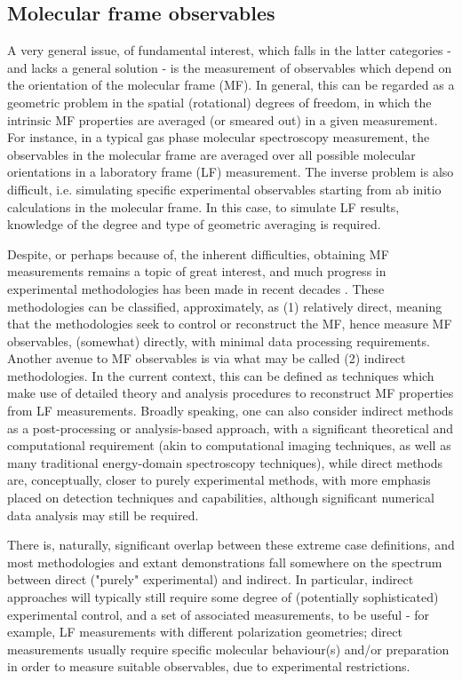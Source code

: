 \subsection{Molecular frame observables}

A very general issue, of fundamental interest, which falls in the latter categories - and lacks a general solution - is the measurement of observables which depend on the orientation of the molecular frame (MF). In general, this can be regarded as a geometric problem in the spatial (rotational) degrees of freedom, in which the intrinsic MF properties are averaged (or smeared out) in a given measurement. For instance, in a typical gas phase molecular spectroscopy measurement, the observables in the molecular frame  are averaged over all possible molecular orientations in a laboratory frame (LF) measurement. The inverse problem is also difficult, i.e. simulating specific experimental observables starting from ab initio calculations in the molecular frame. In this case, to simulate LF results, knowledge of the degree and type of geometric averaging is required. 

Despite, or perhaps because of, the inherent difficulties, obtaining  MF measurements remains a topic of great interest, and much progress in experimental methodologies has been made in recent decades \cite{Becker1998,Reid2003,Reid2012, kleinpoppen2013perfect, Yagishita2015, hockett2018QuantumMetrologyPhotoelectrons}. %
These methodologies can be classified, approximately, as (1) relatively direct, meaning that the methodologies seek to control or reconstruct the MF, hence measure MF observables, (somewhat) directly, with minimal data processing requirements. Another avenue to MF observables is via what may be called (2) indirect methodologies. In the current context, this can be defined as techniques which make use of detailed theory and analysis procedures to reconstruct MF properties from LF measurements. Broadly speaking, one can also consider indirect methods as a post-processing or analysis-based approach, with a significant theoretical and computational requirement (akin to computational imaging techniques, as well as many traditional energy-domain spectroscopy techniques), while direct methods are, conceptually, closer to purely experimental methods, with more emphasis placed on detection techniques and capabilities, although significant numerical data analysis may still be required. 

There is, naturally, significant overlap between these extreme case definitions, and most methodologies and extant demonstrations fall somewhere on the spectrum between direct ("purely" experimental) and indirect. In particular, indirect approaches will typically still require some degree of (potentially sophisticated) experimental control, and a set of associated measurements, to be useful - for example, LF measurements with different polarization geometries; direct measurements usually require specific molecular behaviour(s) and/or preparation in order to measure suitable observables, due to experimental restrictions. 